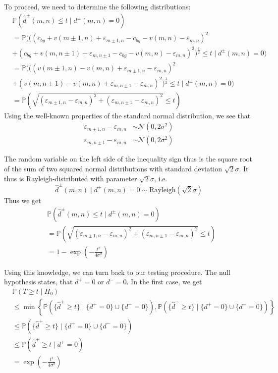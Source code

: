 \documentclass[a4paper,12pt]{article}
\theoremstyle{plain}
\theoremstyle{definition}
\theoremstyle{remark}
\begin{document}
To proceed, we need to determine the following distributions:
\begin{align*}
	&\mathbb{P}(\hat{d}^\pm(m, n) \leq t \mid d^\pm(m, n) = 0) \\
	&= \mathbb{P}(( (c_{bg} + v(m \pm 1, n) + \varepsilon_{m \pm 1, n} - c_{bg} - v(m, n) - \varepsilon_{m, n})^2 \\
	&+ (c_{bg} + v(m, n \pm 1) + \varepsilon_{m, n \pm 1} - c_{bg} - v(m, n) - \varepsilon_{m, n})^2 )^{\frac{1}{2}} \leq t \mid d^\pm(m, n) = 0) \\
	&= \mathbb{P}(( (v(m \pm 1, n) - v(m, n) + \varepsilon_{m \pm 1, n} - \varepsilon_{m, n})^2 \\
	&+ (v(m, n \pm 1) - v(m, n) + \varepsilon_{m, n \pm 1} - \varepsilon_{m, n})^2 )^{\frac{1}{2}} \leq t \mid d^\pm(m, n) = 0) \\
	&= \mathbb{P} \left( \sqrt{ \left( \varepsilon_{m \pm 1, n} - \varepsilon_{m, n} \right)^2 + \left( \varepsilon_{m, n \pm 1} - \varepsilon_{m, n} \right)^2} \leq t \right)
\end{align*}
Using the well-known properties of the standard normal distribution, we see that
\begin{align*}
	\varepsilon_{m \pm 1, n} - \varepsilon_{m, n} &\sim \mathcal{N}(0, 2 \sigma^2) \\
	\varepsilon_{m, n \pm 1} - \varepsilon_{m, n} &\sim \mathcal{N}(0, 2 \sigma^2)
\end{align*}

The random variable on the left side of the inequality sign thus is the square root of the sum of two squared normal distributions with standard deviation $\sqrt{2} \sigma$. It thus is Rayleigh-distributed with parameter $\sqrt{2} \sigma$, i.e.
\begin{equation}\label{dist}
	\hat{d}^\pm(m, n) \mid d^\pm(m, n) = 0 \sim \text{Rayleigh}(\sqrt{2} \sigma)
\end{equation}
Thus we get
\begin{align*}
	&\mathbb{P}(\hat{d}^\pm(m, n) \leq t \mid d^\pm(m, n) = 0) \\
	&= \mathbb{P} \left( \sqrt{ \left( \varepsilon_{m \pm 1, n} - \varepsilon_{m, n} \right)^2 + \left( \varepsilon_{m, n \pm 1} - \varepsilon_{m, n} \right)^2} \leq t \right) \\
	&= 1 - \exp \left( - \frac{t^2}{4 \sigma^2} \right)
\end{align*}

Using this knowledge, we can turn back to our testing procedure. The null hypothesis states, that $d^+ = 0$ or $d^- = 0$. In the first case, we get
\begin{align*}
	&\mathbb{P}(T \geq t \mid H_0) \\
	&\leq \min \left\{ \mathbb{P}(\{ \hat{d}^+ \geq t \} \mid \{ d^+ = 0 \} \cup \{ d^- = 0 \}), \mathbb{P}(\{ \hat{d}^- \geq t \} \mid \{ d^+ = 0 \} \cup \{ d^- = 0 \}) \right\} \\
	&\leq \mathbb{P}(\{ \hat{d}^+ \geq t \} \mid \{ d^+ = 0 \} \cup \{ d^- = 0 \}) \\
	&\leq \mathbb{P}(\hat{d}^+ \geq t \mid d^+ = 0) \\
	&= \exp \left( - \frac{t^2}{4 \sigma^2} \right)
\end{align*}
\end{document}
